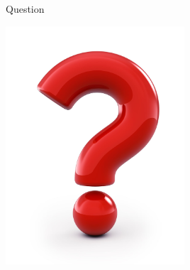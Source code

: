 \documentclass[11pt]{beamer}
\begin{document}
\begin{frame}{Question}
\begin{center}
	\includegraphics[width=0.5\textwidth]{question}
\end{center}
\end{frame}
\end{document}
